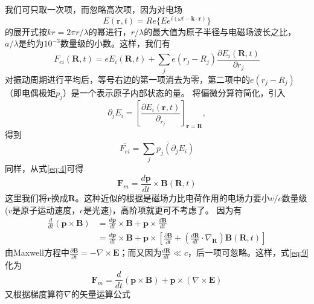 \documentclass{article}
\begin{document}
	我们可只取一次项，而忽略高次项，因为对电场
	\begin{equation*}
		E(\boldsymbol{r},t) = Re\{Ee^{i(\omega t-\boldsymbol{k} \cdot \boldsymbol{r})}\} 
	\end{equation*}
	的展开式按$kr=2\pi r /\lambda$的幂进行，$r/\lambda$的最大值为原子半径与电磁场波长之比，$a/\lambda$是约为$10^{-3}$数量级的小数。这样，我们有
	\begin{equation}
		F_{ei}(\boldsymbol{R},t) = eE_i(\boldsymbol{R},t) + \sum_j e(r_j - R_j) \frac{\partial E_i(\boldsymbol{R},t)}{\partial r_j} \label{eq:7}
	\end{equation}
	对振动周期进行平均后，等号右边的第一项消去为零，第二项中的$e(r_j - R_j)$（即电偶极矩$p_j$）是一个表示原子内部状态的量。
	将偏微分算符简化，引入
	\begin{equation*}
		\partial_j E_i = {\left[\frac{\partial E_i(\boldsymbol{r},t)}{\partial_{r_j}}\right]}_{\boldsymbol{r}=\boldsymbol{R}},
	\end{equation*}
	得到
	\begin{equation}
		\overline{F_{ei}} = \overline{\sum_j p_j(\partial_j E_i)} \label{eq:8}
	\end{equation}
	同样，从式\ref{eq:4}可得
	\begin{equation}
		\boldsymbol{F}_m = \frac{d\boldsymbol{p}}{dt} \times \boldsymbol{B}(\boldsymbol{R},t) \label{eq:9}
	\end{equation}
	这里我们将$\boldsymbol{r}$换成$\boldsymbol{R}$。这种近似的根据是磁场力比电荷作用的电场力要小$v/c$数量级($v$是原子运动速度，$c$是光速)，高阶项就更可不考虑了。
	因为有
	\begin{align*}
		\frac{d}{dt}(\boldsymbol{p} \times \boldsymbol{B}) &= \frac{d\boldsymbol{p}}{dt} \times \boldsymbol{B} + \boldsymbol{p} \times \frac{d\boldsymbol{B}}{dt} \\
		&= \frac{d\boldsymbol{p}}{dt} \times \boldsymbol{B} + \boldsymbol{p} \times \left[ \frac{\partial \boldsymbol{B}}{\partial t} + \left(\frac{d\boldsymbol{R}}{dt} \cdot \nabla_{\boldsymbol{R}}\right)\boldsymbol{B}(\boldsymbol{R},t)\right]
	\end{align*}
	由Maxwell方程中$\frac{\partial \boldsymbol{B}}{\partial t} = -\nabla \times \boldsymbol{E}$；而又因为$\frac{d\boldsymbol{R}}{dt} \ll c$，后一项可忽略。这样，式\ref{eq:9}化为
	\begin{equation}
		\boldsymbol{F}_m = \frac{d}{dt}(\boldsymbol{p} \times \boldsymbol{B}) + \boldsymbol{p} \times (\nabla \times \boldsymbol{E}) \label{eq:10}
	\end{equation}
	又根据梯度算符$\nabla$的矢量运算公式
\end{document}
